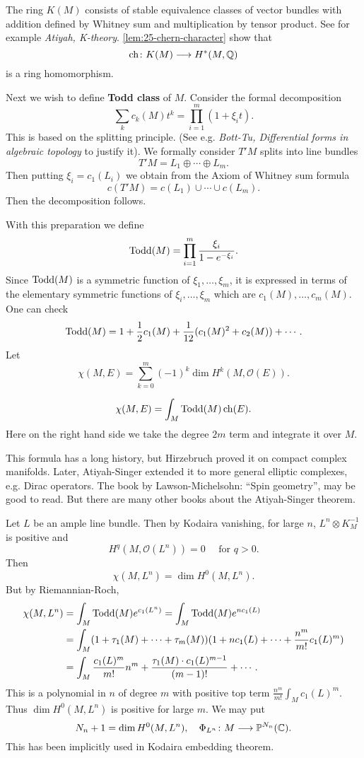 \documentclass[12pt]{article}
\begin{document}
The ring \(K(M)\) consists of stable equivalence classes of vector bundles with
addition defined by Whitney sum and multiplication by tensor product. See for example
\emph{Atiyah, K-theory}. \cref{lem:25-chern-character} show that \[
  \operatorname{ch}\colon K(M)\longrightarrow H^*(M,\mathbb{Q})
\] is a ring homomorphism.

Next we wish to define \textbf{Todd class} of \(M\). Consider the formal
decomposition \[
  \sum_{k}c_k(M)t^k=\prod_{i=1}^m(1+\xi_i t)
.\] This is based on the splitting principle. (See e.g. \emph{Bott-Tu, Differential
forms in algebraic topology} to justify it). We formally consider \(T'M\) splits
into line bundles \[
  T'M=L_1\oplus \cdots\oplus L_m
.\] Then putting \(\xi_i=c_1(L_i)\) we obtain from the Axiom of Whitney sum formula \[
  c(T'M)=c(L_1)\cup \cdots\cup c(L_m)
.\] Then the decomposition follows.

With this preparation we define \[
  \operatorname{Todd}(M)=\prod_{i=1}^{m}\frac{\xi_i}{1-e^{-\xi_i}}
.\] Since \(\operatorname{Todd}(M)\) is a symmetric function of \(\xi_1,\ldots,\xi_m\), it is
expressed in terms of the elementary symmetric functions of \(\xi_i,\ldots,\xi_m\)
which are \(c_1(M),\ldots,c_m(M)\). One can check \[
  \operatorname{Todd}(M)=1+\frac{1}{2}c_1(M)+\frac{1}{12}(c_1(M)^2+c_2(M))+\cdots
.\] Let \[
  \chi(M,E)=\sum_{k=0}^{m}(-1)^k \dim H^k(M,\mathcal{O}(E))
.\] 

\begin{theorem}
  \[
    \chi(M,E)=\int_{M}\operatorname{Todd}(M)\operatorname{ch}(E)
  .\] Here on the right hand side we take the degree \(2m\) term and integrate it
  over \(M\).
\end{theorem}

This formula has a long history, but Hirzebruch proved it on compact complex manifolds.
Later, Atiyah-Singer extended it to more general elliptic complexes, e.g. Dirac
operators. The book by Lawson-Michelsohn: ``Spin geometry'', may be good to read.
But there are many other books about the Atiyah-Singer theorem.

Let \(L\) be an ample line bundle. Then by Kodaira vanishing, for large \(n\),
\(L^n\otimes K_M^{-1}\) is positive and \[
  H^q(M,\mathcal{O}(L^n))=0\quad\text{ for }q>0
.\] Then \[
  \chi(M,L^n)=\dim H^0(M,L^n)
.\] But by Riemannian-Roch, 
\begin{align*}
  \chi(M,L^n)&=\int_{M}\operatorname{Todd}(M)e^{c_1(L^n)}=\int_{M}\operatorname{Todd}(M)e^{nc_1(L)} \\
  &=\int_{M}(1+\tau_1(M)+\cdots +\tau_m(M))(1+nc_1(L)+\cdots +\frac{n^m}{m!}c_1(L)^m)\\
  &=\int_{M}\frac{c_1(L)^m}{m!}n^m+\frac{\tau_1(M)\cdot c_1(L)^{m-1}}{(m-1)!}+\cdots
.\end{align*}
This is a polynomial in \(n\) of degree \(m\) with positive top term
\(\frac{n^m}{m!}\int_{M}c_1(L)^m\). Thus \(\dim H^0(M,L^n)\) is positive for large
\(m\). We may put \[
  N_n+1=\dim H^0(M,L^n),\quad \Phi_{L^n}\colon M\longrightarrow \mathbb{P}^{N_n}(\mathbb{C})
.\] This has been implicitly used in Kodaira embedding theorem.
\end{document}
